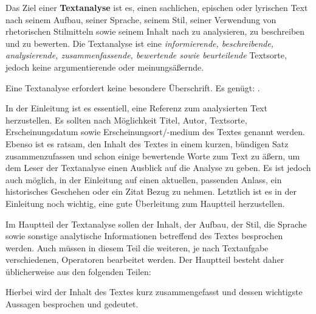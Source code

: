 






Das Ziel einer \textbf{Textanalyse} ist es, einen sachlichen, epischen oder lyrischen Text nach seinem Aufbau, seiner Sprache, seinem Stil, seiner Verwendung von rhetorischen Stilmitteln sowie seinem Inhalt nach zu analysieren, zu beschreiben und zu bewerten. Die Textanalyse ist eine \emph{informierende, beschreibende, analysierende, zusammenfassende, bewertende sowie beurteilende} Textsorte, jedoch keine argumentierende oder meinungs\"{a}\ss{}ernde. 


\begin{enumerate}


	Eine Textanalyse erfordert keine besondere \"{U}berschrift. Es gen\"{u}gt: .


	In der Einleitung ist es essentiell, eine Referenz zum analysierten Text herzustellen. Es sollten nach M\"{o}glichkeit Titel, Autor, Textsorte, Erscheinungsdatum sowie Erscheinungsort/-medium des Textes genannt werden. Ebenso ist es ratsam, den Inhalt des Textes in einem kurzen, b\"{u}ndigen Satz zusammenzufassen und schon einige bewertende Worte zum Text zu \"{a}\ss{}ern, um dem Leser der Textanalyse einen Ausblick auf die Analyse zu geben. Es ist jedoch auch m\"{o}glich, in der Einleitung auf einen aktuellen, passenden Anlass, ein historisches Geschehen oder ein Zitat Bezug zu nehmen. Letztlich ist es in der Einleitung noch wichtig, eine gute \"{U}berleitung zum Hauptteil herzustellen.


		Im Hauptteil der Textanalyse sollen der Inhalt, der Aufbau, der Stil, die Sprache sowie sonstige analytische Informationen betreffend des Textes besprochen werden. Auch m\"{u}ssen in diesem Teil die weiteren, je nach Textaufgabe verschiedenen, Operatoren bearbeitet werden. Der Hauptteil besteht daher \"{u}blicherweise aus den folgenden Teilen:

		\begin{enumerate}


			Hierbei wird der Inhalt des Textes kurz zusammengefasst und dessen wichtigste Aussagen besprochen und gedeutet.


\end{enumerate}
\end{enumerate}

